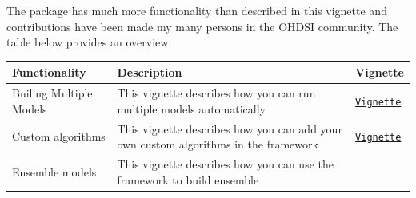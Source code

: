 \documentclass[]{book}
\begin{document}
The package has much more functionality than described in this vignette
and contributions have been made my many persons in the OHDSI community.
The table below provides an overview:

\begin{longtable}[]{@{}lll@{}}
\toprule
\begin{minipage}[b]{0.19\columnwidth}\raggedright\strut
Functionality\strut
\end{minipage} & \begin{minipage}[b]{0.54\columnwidth}\raggedright\strut
Description\strut
\end{minipage} & \begin{minipage}[b]{0.19\columnwidth}\raggedright\strut
Vignette\strut
\end{minipage}\tabularnewline
\midrule
\endhead
\begin{minipage}[t]{0.19\columnwidth}\raggedright\strut
Builing Multiple Models\strut
\end{minipage} & \begin{minipage}[t]{0.54\columnwidth}\raggedright\strut
This vignette describes how you can run multiple models
automatically\strut
\end{minipage} & \begin{minipage}[t]{0.19\columnwidth}\raggedright\strut
\href{https://github.com/OHDSI/PatientLevelPrediction/blob/master/inst/doc/BuildingMultiplePredictiveModels.pdf}{\texttt{Vignette}}\strut
\end{minipage}\tabularnewline
\begin{minipage}[t]{0.19\columnwidth}\raggedright\strut
Custom algorithms\strut
\end{minipage} & \begin{minipage}[t]{0.54\columnwidth}\raggedright\strut
This vignette describes how you can add your own custom algorithms in
the framework\strut
\end{minipage} & \begin{minipage}[t]{0.19\columnwidth}\raggedright\strut
\href{https://github.com/OHDSI/PatientLevelPrediction/blob/master/inst/doc/AddingCustomAlgorithms.pdf}{\texttt{Vignette}}\strut
\end{minipage}\tabularnewline
\begin{minipage}[t]{0.19\columnwidth}\raggedright\strut
Ensemble models\strut
\end{minipage} & \begin{minipage}[t]{0.54\columnwidth}\raggedright\strut
This vignette describes how you can use the framework to build ensemble

\end{minipage}
\end{longtable}
\end{document}
